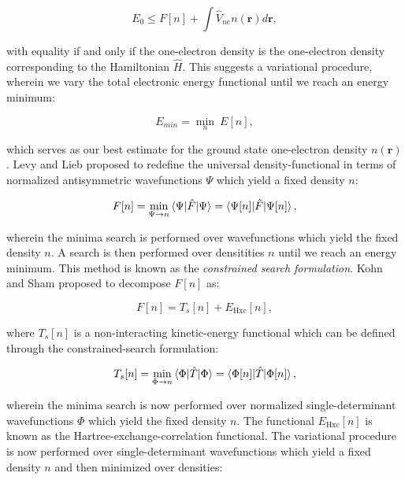 \begin{equation}
 E_0 \leq F[n] + \int \hat{V}_{ne} n(\bm{r}) d\bm{r} , 
\end{equation}

with equality if and only if the one-electron density
is the one-electron density corresponding to the Hamiltonian $\hat{H}$.
This suggests a variational procedure, wherein
we vary the total electronic energy functional
until we reach an energy minimum:

\begin{equation}
 E_{min} = \underset{n}{\min} \ E[n] , 
\end{equation}

which serves as our best estimate for the ground state
one-electron density $n(\bm{r})$.
Levy and Lieb \cite{levy1979universal, perdew1982density, perdew1983physical}
proposed to redefine the universal density-functional
in terms of normalized antisymmetric wavefunctions $\Psi$
which yield a fixed density $n$:

\begin{equation}
 F[n] = \underset{\Psi \rightarrow n}{\min}
    \braket{\Psi | \hat{F} | \Psi}
    = \braket{\Psi[n] | \hat{F} | \Psi[n]} , 
\end{equation}

wherein the minima search is performed over wavefunctions
which yield the fixed density $n$.
A search is then performed over densitities $n$
until we reach an energy minimum. This method
is known as the \textit{constrained search formulation}.
Kohn and Sham \cite{PhysRev.140.A1133} proposed to decompose $F[n]$ as:

\begin{equation}
 F[n] = T_s[n] + E_{\text{Hxc}}[n] , 
\end{equation}

where $T_s[n]$ is a non-interacting kinetic-energy functional
which can be defined through the constrained-search formulation:

\begin{equation}
 T_s[n] = \underset{\Phi \rightarrow n}{\min}
    \braket{\Phi | \hat{T} | \Phi}
    = \braket{\Phi[n] | \hat{T} | \Phi[n]} , 
\end{equation}

wherein the minima search is now performed over normalized
single-determinant wavefunctions $\Phi$ which yield
the fixed density $n$. The functional
$E_{\text{Hxc}}[n]$ is known as the Hartree-exchange-correlation
functional. The variational procedure is now
performed over single-determinant wavefunctions
which yield a fixed density $n$ and then
minimized over densities:

